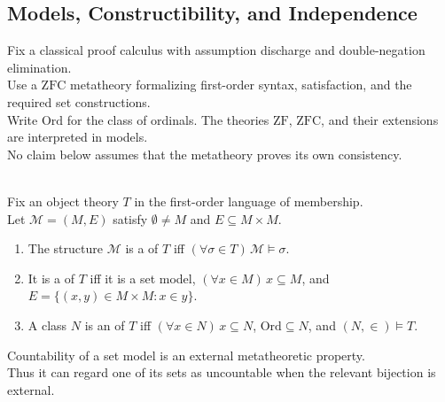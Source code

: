 \subsection{Models, Constructibility, and Independence}

Fix a classical proof calculus with assumption discharge and double-negation elimination.\\
Use a $\mathrm{ZFC}$ metatheory formalizing first-order syntax, satisfaction, and the required set constructions.\\
Write $\mathrm{Ord}$ for the class of ordinals. The theories $\mathrm{ZF}$, $\mathrm{ZFC}$, and their extensions are  interpreted in models.\\
No claim below assumes that the metatheory proves its own consistency.

\begin{definition} \label{def:models-and-inner-models-of-set-theory} \\
Fix an object theory $T$ in the first-order language of membership.\\
Let $\mathcal{M}=(M,E)$ satisfy $\emptyset\neq M$ and $E\subseteq M\times M$.
\begin{enumerate}[label=(\roman*)]
\setlength{\itemsep}{0pt}
\item The structure $\mathcal{M}$ is a  of $T$ iff $(\forall\sigma\in T)\,\mathcal{M}\models\sigma$.
\item It is a  of $T$ iff it is a set model, $(\forall x\in M)\,x\subseteq M$, and $E=\{(x,y)\in M\times M:x\in y\}$.
\item A class $N$ is an  of $T$ iff $(\forall x\in N)\,x\subseteq N$, $\mathrm{Ord}\subseteq N$, and $(N,\in)\models T$.
\end{enumerate}
Countability of a set model is an external metatheoretic property.\\
Thus it can regard one of its sets as uncountable when the relevant bijection is external.
\end{definition}

